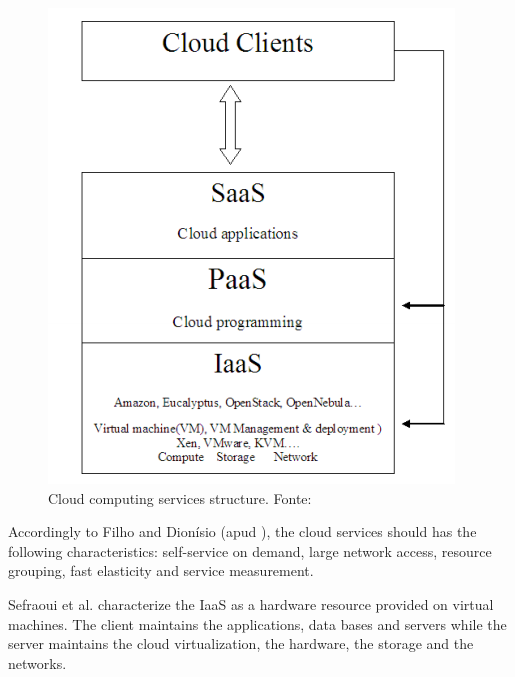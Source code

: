 \documentclass[conference]{IEEEtran}
\begin{document}
\begin{figure}[ht]
\centering
\includegraphics[width=.3\textwidth]{figuras/cloud_structure.png}
\caption{Cloud computing services structure. Fonte: \cite{sefraoui2012openstack}}
\label{fig:cloud_structure}
\end{figure}


Accordingly to Filho and Dionísio \cite{leite2016influencia} (apud \cite{mell2011nist}), the cloud services should has the following 
characteristics: self-service on demand, large network access, resource grouping, fast elasticity and service measurement.


Sefraoui et al. \cite{sefraoui2012openstack} characterize the IaaS as a hardware resource provided on virtual machines. The client
maintains the applications, data bases and servers while the server maintains the cloud virtualization, the hardware, the storage and the networks.   

\end{document}
